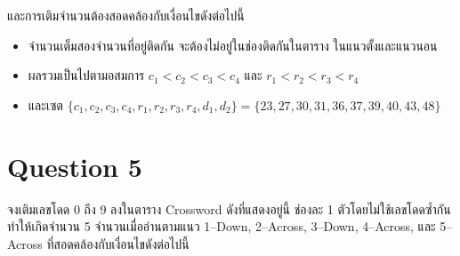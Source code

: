 \noindent
และการเติมจำนวนต้องสอดคล้องกับเงื่อนไขดังต่อไปนี้

\begin{itemize}[topsep=0pc,itemsep=0pc]
\item  จำนวนเต็มสองจำนวนที่อยู่ติดกัน จะต้องไม่อยู่ในช่องติดกันในตาราง ในแนวตั้งและแนวนอน
\item  ผลรวมเป็นไปตามอสมการ $c_1 < c_2 < c_3 < c_4$ และ $r_1 < r_2 < r_3 < r_4$
\item  และเซต $\{c_1, c_2, c_3, c_4, r_1, r_2, r_3, r_4, d_1, d_2\} = \{23, 27, 30, 31, 36, 37, 39, 40, 43, 48\}$
\end{itemize}


\newpage
{}
\section{Question 5}

จงเติมเลขโดด 0 ถึง 9 ลงในตาราง Crossword ดังที่แสดงอยู่นี้ ช่องละ 1 ตัวโดยไม่ใช้เลขโดดซ้ำกัน ทำให้เกิดจำนวน 5 จำนวนเมื่ออ่านตามแนว 1–Down, 2–Across, 3–Down, 4–Across, และ 5–Across ที่สอดคล้องกับเงื่อนไขดังต่อไปนี้

\medskip

